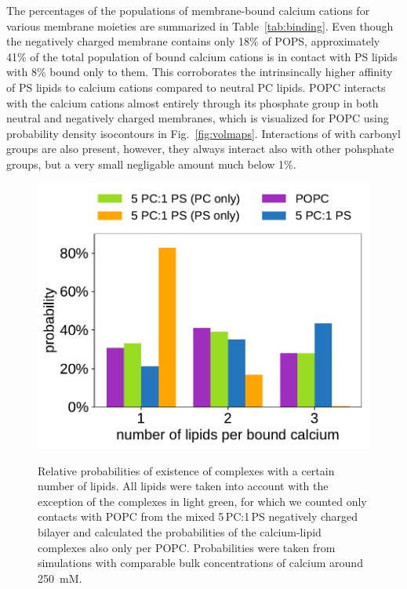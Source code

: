 The percentages of the populations of membrane-bound calcium cations for various membrane moieties 
are summarized in Table~\ref{tab:binding}.
Even though the negatively charged membrane contains only 18\% of POPS, 
approximately 41\% of the total population of bound calcium cations is in contact with PS lipids
with 8\% bound only to them. 
This corroborates the intrinsincally higher affinity of PS lipids to calcium cations compared to neutral PC lipids. 
POPC interacts with the calcium cations almost entirely through its phosphate group 
in both neutral and negatively charged membranes, 
which is visualized for POPC using probability density isocontours in Fig.~\ref{fig:volmaps}.
Interactions of  with carbonyl groups are also present, 
however, they always interact also with other pohsphate groups, 
but a very small negligable amount much below 1\%. 



\begin{figure}[tb!] 
  \centering 
  \includegraphics[width=\figwidth]{../img/stoichiometry_CaCl2_comparison_Ecc-lipids_PC-vs-PCPS.pdf} \\ 
  \caption{\label{fig:cacl_complexes} 
      Relative probabilities of existence of  complexes 
      with a certain number of lipids.  
      All lipids were taken into account with the exception of the complexes in light green, 
      for which we counted only contacts with POPC from the mixed 5\,PC:1\,PS negatively charged bilayer 
      and calculated the probabilities of the calcium-lipid complexes also only per POPC. 
      Probabilities were taken from simulations with comparable bulk concentrations of calcium around 250~mM. 
  } 
\end{figure} 




